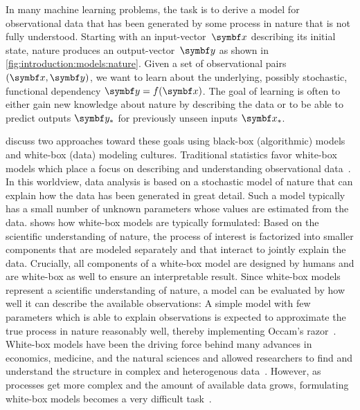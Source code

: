 In many machine learning problems, the task is to derive a model for observational data that has been generated by some process in nature that is not fully understood.
Starting with an input-vector~$\mat{x}$ describing its initial state, nature produces an output-vector~$\mat{y}$ as shown in \cref{fig:introduction:models:nature}.
Given a set of observational pairs $(\mat{x}, \mat{y})$, we want to learn about the underlying, possibly stochastic, functional dependency $\mat{y} = f(\mat{x})$.
The goal of learning is often to either gain new knowledge about nature by describing the data or to be able to predict outputs $\mat{y}_\ast$ for previously unseen inputs $\mat{x}_\ast$.

\Textcite{breiman_statistical_2001,shmueli_explain_2010} discuss two approaches toward these goals using black-box (algorithmic) models and white-box (data) modeling cultures.
Traditional statistics favor white-box models which place a focus on describing and understanding observational data~\parencite{andrew_gelman_bayesian_2013,casella_statistical_2002,cox_planning_1958}.
In this worldview, data analysis is based on a stochastic model of nature that can explain how the data has been generated in great detail.
Such a model typically has a small number of unknown parameters whose values are estimated from the data.
 shows how white-box models are typically formulated:
Based on the scientific understanding of nature, the process of interest is factorized into smaller components that are modeled separately and that interact to jointly explain the data.
Crucially, all components of a white-box model are designed by humans and are white-box as well to ensure an interpretable result.
Since white-box models represent a scientific understanding of nature, a model can be evaluated by how well it can describe the available observations:
A simple model with few parameters which is able to explain observations is expected to approximate the true process in nature reasonably well, thereby implementing Occam's razor~\parencite{thorburn_occams_1915}.
White-box models have been the driving force behind many advances in economics, medicine, and the natural sciences and allowed researchers to find and understand the structure in complex and heterogenous data~\parencite{efron_modern_2005,giulio_d._agostini_bayesian_2003}.
However, as processes get more complex and the amount of available data grows, formulating white-box models becomes a very difficult task~\parencite{sutton_bitter_2019}.

